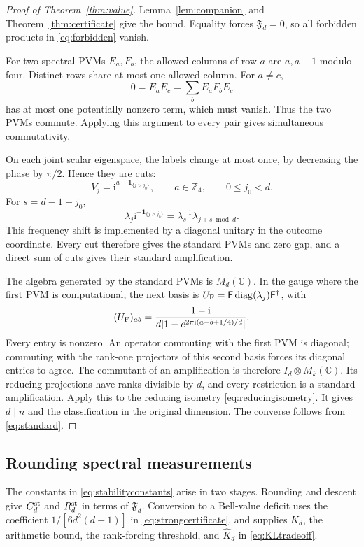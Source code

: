 \documentclass[11pt]{amsart}
\theoremstyle{remark}
\theoremstyle{plain}
\numberwithin{equation}{section}
\DeclareMathOperator{\diag}{diag}
\newcommand{\C}{\mathbb C}
\newcommand{\Z}{\mathbb Z}
\newcommand{\ii}{\mathrm i}
\newcommand{\ind}{\mathbf 1}
\newcommand{\Fdef}{\mathfrak F_d}
\begin{document}
\begin{proof}[Proof of Theorem~\ref{thm:value}]
Lemma~\ref{lem:companion} and Theorem~\ref{thm:certificate} give the
bound. Equality forces \(\Fdef=0\), so all forbidden products in
\eqref{eq:forbidden} vanish.

For two spectral PVMs \(E_a,F_b\), the allowed columns of row \(a\)
are \(a,a-1\) modulo four. Distinct rows share at most one allowed
column. For \(a\ne c\),
\[
 0=E_aE_c=\sum_bE_aF_bE_c
\]
has at most one potentially nonzero term, which must vanish.
Thus the two PVMs commute. Applying this argument to every pair
gives simultaneous commutativity.

On each joint scalar eigenspace, the labels change at most once,
by decreasing the phase by \(\pi/2\). Hence they are cuts:
\begin{equation}\label{eq:cuts}
 V_j=\ii^{a-\ind_{\{j>j_0\}}},
 \qquad a\in\Z_4,\qquad 0\le j_0<d.
\end{equation}
For \(s=d-1-j_0\),
\[
 \lambda_j\ii^{-\ind_{\{j>j_0\}}}
 =\lambda_s^{-1}\lambda_{j+s\bmod d}.
\]
This frequency shift is implemented by a diagonal unitary in the
outcome coordinate. Every cut therefore gives the standard PVMs
and zero gap, and a direct sum of cuts gives their standard
amplification.

The algebra generated by the standard PVMs is \(M_d(\C)\).
In the gauge where the first PVM is computational, the next basis
is \(U_{\rm F}=\mathsf F\diag(\lambda_j)\mathsf F^\dagger\), with
\[
 (U_{\rm F})_{ab}
 =\frac{1-\ii}{d[1-e^{2\pi\ii(a-b+1/4)/d}]}.
\]
Every entry is nonzero.
An operator commuting with the first PVM is diagonal; commuting
with the rank-one projectors of this second basis forces its
diagonal entries to agree. The commutant of an amplification is
therefore \(I_d\otimes M_k(\C)\). Its reducing projections have ranks
divisible by \(d\), and every restriction is a standard amplification.
Apply this to the reducing isometry \eqref{eq:reducingisometry}.
It gives \(d\mid n\) and the classification in the original dimension.
The converse follows from \eqref{eq:standard}.
\end{proof}

\subsection{Rounding spectral measurements}

The constants in \eqref{eq:stabilityconstants} arise in two stages.
Rounding and descent give \(C_d^{\rm st}\) and \(R_d^{\rm st}\) in
terms of \(\Fdef\). Conversion to a Bell-value deficit uses the
coefficient \(1/[6d^2(d+1)]\) in \eqref{eq:strongcertificate}, and
supplies \(K_d\), the arithmetic bound, the rank-forcing threshold,
and \(\widehat K_d\) in \eqref{eq:KLtradeoff}.
\end{document}
